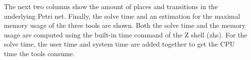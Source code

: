 The next two columns show the amount of places and transitions in the underlying Petri net.
Finally, the solve time and an estimation for the maximal memory usage of the three tools are shown. Both the solve time and the memory usage are computed using the built-in \textsf{time} command of the Z shell (zhs). For the solve time, the user time and system time are added together to get the CPU time the tools consume. 

\begin{table}[H]
\centering
{}
\end{table}
